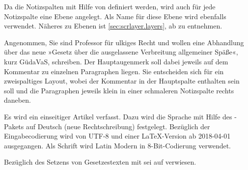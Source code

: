 Da die Notizspalten mit Hilfe von \hyperref[cha:scrlayer]{}%
 definiert werden, wird
auch für jede Notizspalte eine Ebene angelegt. Als
Name für diese Ebene wird ebenfalls
 verwendet. Näheres zu Ebenen
ist \autoref{sec:scrlayer.layers}, ab  zu
entnehmen.
%
\begin{Example}
  Angenommen, Sie sind Professor für ulkiges Recht und wollen eine Abhandlung
  über das neue »Gesetz über die ausgelassene Verbreitung allgemeiner Späße«,
  kurz GüdaVaS, schreiben. Der Hauptaugenmerk soll dabei jeweils auf dem
  Kommentar zu einzelnen Paragraphen liegen. Sie entscheiden sich für ein
  zweispaltiges Layout, wobei der Kommentar in der Hauptspalte enthalten sein
  soll und die Paragraphen jeweils klein in einer
  schmaleren Notizspalte rechts daneben.
  Es wird ein einseitiger Artikel verfasst. Dazu wird die
  Sprache mit Hilfe
  des -Pakets auf Deutsch (neue
  Rechtschreibung) festgelegt. Bezüglich der Eingabecodierung wird von UTF-8
  und einer \LaTeX-Version ab 2018-04-01 ausgegangen. Als Schrift
  wird Latin Modern in 8-Bit-Codierung verwendet.

  Bezüglich des Setzens von Gesetzestexten mit
  \hyperref[cha:scrjura]{} sei auf
   verwiesen.


\end{Example}
